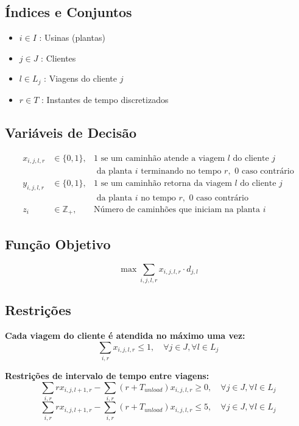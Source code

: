 \subsection*{Índices e Conjuntos}
\begin{itemize}
    \item \( i \in I \) : Usinas (plantas)
    \item \( j \in J \) : Clientes
    \item \( l \in L_j \) : Viagens do cliente \( j \)
    \item \( r \in T \) : Instantes de tempo discretizados
\end{itemize}

\subsection*{Variáveis de Decisão}
\begin{align*}
    x_{i,j,l,r} & \in \{0,1\}, & \text{1 se um caminhão atende a viagem } l \text{ do cliente } j \\ 
                &  & \text{ da planta } i \text{ terminando no tempo } r, \text{ 0 caso contrário} \\
    y_{i,j,l,r} & \in \{0,1\}, & \text{1 se um caminhão retorna da viagem } l \text{ do cliente } j \\ 
                &  & \text{ da planta } i \text{ no tempo } r, \text{ 0 caso contrário} \\
    z_i & \in \mathbb{Z}_+, & \text{Número de caminhões que iniciam na planta } i
\end{align*}


\subsection*{Função Objetivo}
\begin{equation}
    \max \sum_{i,j,l,r} x_{i,j,l,r} \cdot d_{j,l}
\end{equation}

\subsection*{Restrições}

\textbf{Cada viagem do cliente é atendida no máximo uma vez:}
\begin{equation}
    \sum_{i,r} x_{i,j,l,r} \leq 1, \quad \forall j \in J, \forall l \in L_j
\end{equation}

\textbf{Restrições de intervalo de tempo entre viagens:}
\begin{equation}
    \sum_{i,r} r x_{i,j,l+1,r} - \sum_{i,r} (r + T_{unload}) x_{i,j,l,r} \geq 0, \quad \forall j \in J, \forall l \in L_j
\end{equation}
\begin{equation}
    \sum_{i,r} r x_{i,j,l+1,r} - \sum_{i,r} (r + T_{unload}) x_{i,j,l,r} \leq 5, \quad \forall j \in J, \forall l \in L_j
\end{equation}

